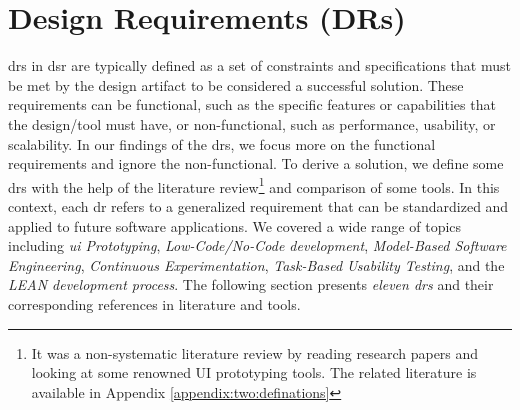 \section{Design Requirements (DRs)}
\label{design:section:designReqs}
\ac{dr}s in \ac{dsr} are typically defined as a set of constraints and specifications that must be met by the design artifact to be considered a successful solution. 
These requirements can be functional, such as the specific features or capabilities that the design/tool must have, or non-functional, such as performance, usability, or scalability.
In our findings of the \ac{dr}s, we focus more on the functional requirements and ignore the non-functional.
To derive a solution, we define some \ac{dr}s with the help of the literature review\footnote{It was a non-systematic literature review by reading research papers and looking at some renowned UI prototyping tools. The related literature is available in Appendix \ref{appendix:two:definations}} and comparison of some tools.
In this context, each \ac{dr} refers to a generalized requirement that can be standardized and applied to future software applications.
We covered a wide range of topics including \textit{\ac{ui} Prototyping}, \textit{Low-Code/No-Code development}, \textit{Model-Based Software Engineering}, \textit{Continuous Experimentation}, \textit{Task-Based Usability Testing}, and the \textit{LEAN development process}.
The following section presents \textit{eleven \ac{dr}s} and their corresponding references in literature and tools.
